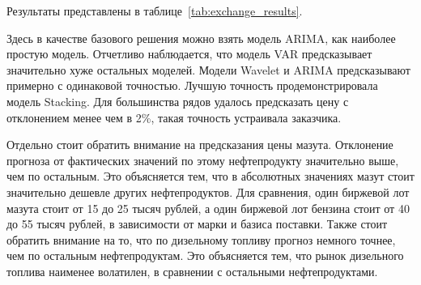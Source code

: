\documentclass[a4paper,article,14pt]{extarticle}
\begin{document}
Результаты представлены в таблице~\ref{tab:exchange_results}.

Здесь в качестве базового решения можно взять модель ARIMA, как наиболее простую модель.
Отчетливо наблюдается, что модель VAR предсказывает значительно хуже остальных моделей.
Модели Wavelet и ARIMA предсказывают примерно с одинаковой точностью.
Лучшую точность продемонстрировала модель Stacking.
Для большинства рядов удалось предсказать цену с отклонением менее чем в 2\%, такая точность устраивала заказчика.

Отдельно стоит обратить внимание на предсказания цены мазута.
Отклонение прогноза от фактических значений по этому нефтепродукту значительно выше, чем по остальным.
Это объясняется тем, что в абсолютных значениях мазут стоит значительно дешевле других нефтепродуктов.
Для сравнения, один биржевой лот мазута стоит от 15 до 25 тысяч рублей, а один биржевой лот бензина стоит от 40 до 55 тысяч рублей, в зависимости от марки и базиса поставки.
Также стоит обратить внимание на то, что по дизельному топливу прогноз немного точнее, чем по остальным нефтепродуктам.
Это объясняется тем, что рынок дизельного топлива наименее волатилен, в сравнении с остальными нефтепродуктами.
\end{document}
